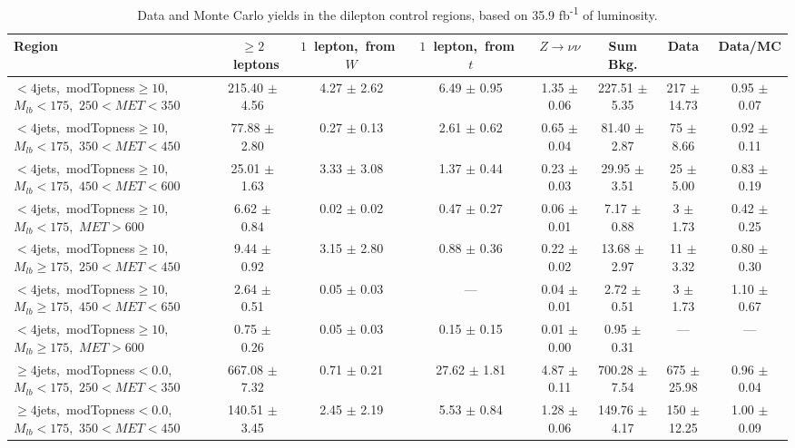 \begin{table}
\centering
{\scriptsize
\caption{Data and Monte Carlo yields in the dilepton control regions,
  based on 35.9 fb\textsuperscript{-1} of luminosity.}
\label{tab:stop:lostlep:cryields}
\begin{tabular}{|l|c c c c c|c|c|}
\hline
Region  & $\ge2$~leptons & $1$~lepton,~from~$W$ & $1$~lepton,~from~$t$ & $Z\rightarrow\nu\nu$ & Sum Bkg. & Data & Data/MC \\*
\hline \hline
$<4$jets,~modTopness$\ge10$,~$M_{lb}<175$,~$250<MET<350$  & 215.40 $\pm$ 4.56  & 4.27 $\pm$ 2.62  & 6.49 $\pm$ 0.95  & 1.35 $\pm$ 0.06  & 227.51 $\pm$ 5.35  & 217 $\pm$ 14.73  & 0.95 $\pm$ 0.07 \\*
$<4$jets,~modTopness$\ge10$,~$M_{lb}<175$,~$350<MET<450$  & 77.88 $\pm$ 2.80  & 0.27 $\pm$ 0.13  & 2.61 $\pm$ 0.62  & 0.65 $\pm$ 0.04  & 81.40 $\pm$ 2.87  & 75 $\pm$ 8.66  & 0.92 $\pm$ 0.11 \\*
$<4$jets,~modTopness$\ge10$,~$M_{lb}<175$,~$450<MET<600$  & 25.01 $\pm$ 1.63  & 3.33 $\pm$ 3.08  & 1.37 $\pm$ 0.44  & 0.23 $\pm$ 0.03  & 29.95 $\pm$ 3.51  & 25 $\pm$ 5.00  & 0.83 $\pm$ 0.19 \\*
$<4$jets,~modTopness$\ge10$,~$M_{lb}<175$,~$MET>600$  & 6.62 $\pm$ 0.84  & 0.02 $\pm$ 0.02  & 0.47 $\pm$ 0.27  & 0.06 $\pm$ 0.01  & 7.17 $\pm$ 0.88  & 3 $\pm$ 1.73  & 0.42 $\pm$ 0.25 \\*
\hline
$<4$jets,~modTopness$\ge10$,~$M_{lb}\ge175$,~$250<MET<450$  & 9.44 $\pm$ 0.92  & 3.15 $\pm$ 2.80  & 0.88 $\pm$ 0.36  & 0.22 $\pm$ 0.02  & 13.68 $\pm$ 2.97  & 11 $\pm$ 3.32  & 0.80 $\pm$ 0.30 \\*
$<4$jets,~modTopness$\ge10$,~$M_{lb}\ge175$,~$450<MET<650$  & 2.64 $\pm$ 0.51  & 0.05 $\pm$ 0.03  & ---  & 0.04 $\pm$ 0.01  & 2.72 $\pm$ 0.51  & 3 $\pm$ 1.73  & 1.10 $\pm$ 0.67 \\*
$<4$jets,~modTopness$\ge10$,~$M_{lb}\ge175$,~$MET>600$  & 0.75 $\pm$ 0.26  & 0.05 $\pm$ 0.03  & 0.15 $\pm$ 0.15  & 0.01 $\pm$ 0.00  & 0.95 $\pm$ 0.31  & --- & --- \\*
\hline
$\ge4$jets,~modTopness$<0.0$,~$M_{lb}<175$,~$250<MET<350$  & 667.08 $\pm$ 7.32  & 0.71 $\pm$ 0.21  & 27.62 $\pm$ 1.81  & 4.87 $\pm$ 0.11  & 700.28 $\pm$ 7.54  & 675 $\pm$ 25.98  & 0.96 $\pm$ 0.04 \\*
$\ge4$jets,~modTopness$<0.0$,~$M_{lb}<175$,~$350<MET<450$  & 140.51 $\pm$ 3.45  & 2.45 $\pm$ 2.19  & 5.53 $\pm$ 0.84  & 1.28 $\pm$ 0.06  & 149.76 $\pm$ 4.17  & 150 $\pm$ 12.25  & 1.00 $\pm$ 0.09 \\*

\end{tabular}}
\end{table}
